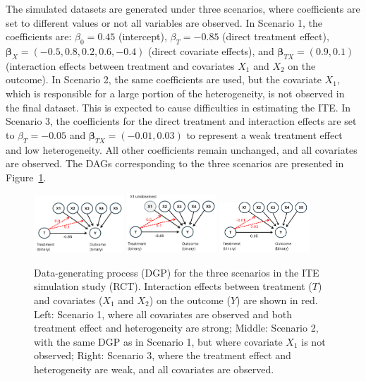 The simulated datasets are generated under three scenarios, where coefficients are set to different values or not all variables are observed. In Scenario 1, the coefficients are: $\beta_0 = 0.45$ (intercept), $\beta_T = -0.85$ (direct treatment effect), $\boldsymbol{\beta}_X = (-0.5, 0.8, 0.2, 0.6, -0.4)$ (direct covariate effects), and $\boldsymbol{\beta}_{TX} = (0.9, 0.1)$ (interaction effects between treatment and covariates $X_1$ and $X_2$ on the outcome). In Scenario 2, the same coefficients are used, but the covariate $X_1$, which is responsible for a large portion of the heterogeneity, is not observed in the final dataset. This is expected to cause difficulties in estimating the ITE. In Scenario 3, the coefficients for the direct treatment and interaction effects are set to $\beta_T = -0.05$ and $\boldsymbol{\beta}_{TX} = (-0.01, 0.03)$ to represent a weak treatment effect and low heterogeneity. All other coefficients remain unchanged, and all covariates are observed. The DAGs corresponding to the three scenarios are presented in Figure~\ref{fig:simulation_dags}.



\begin{figure}[H]
\centering
\includegraphics[width=0.3\textwidth]{img/results_ITE_simulation/simulation_observed.png}
\includegraphics[width=0.3\textwidth]{img/results_ITE_simulation/simulation_unobserved.png}
\includegraphics[width=0.3\textwidth]{img/results_ITE_simulation/simulation_small_effects.png}
\caption{Data-generating process (DGP) for the three scenarios in the ITE simulation study (RCT). Interaction effects between treatment ($T$) and covariates ($X_1$ and $X_2$) on the outcome ($Y$) are shown in red. Left: Scenario 1, where all covariates are observed and both treatment effect and heterogeneity are strong; Middle: Scenario 2, with the same DGP as in Scenario 1, but where covariate $X_1$ is not observed; Right: Scenario 3, where the treatment effect and heterogeneity are weak, and all covariates are observed.}
\label{fig:simulation_dags}
\end{figure}





